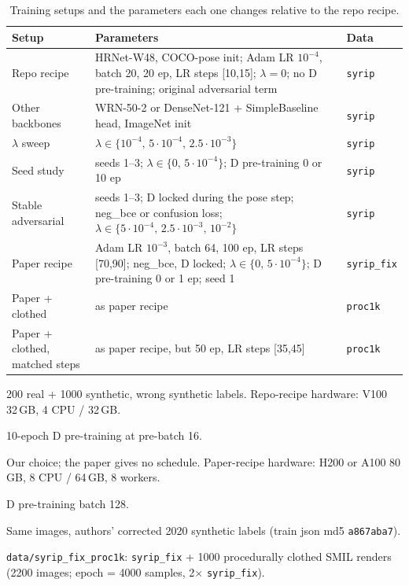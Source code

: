 \documentclass[10pt]{article}
\begin{document}
\begin{table}[h]\centering\small
\begin{threeparttable}
\caption{Training setups and the parameters each one changes relative to the repo recipe.}
\label{tab:setups}
\begin{tabularx}{\linewidth}{l X l}
\toprule
Setup & Parameters & Data \\
\midrule
Repo recipe & HRNet-W48, COCO-pose init; Adam LR $10^{-4}$, batch 20, 20 ep, LR steps [10,15]; $\lambda=0$; no D pre-training; original adversarial term & \texttt{syrip}\tnote{a} \\
Other backbones & WRN-50-2 or DenseNet-121 + SimpleBaseline head, ImageNet init & \texttt{syrip} \\
$\lambda$ sweep & $\lambda \in \{10^{-4},\, 5\cdot10^{-4},\, 2.5\cdot10^{-3}\}$ & \texttt{syrip} \\
Seed study & seeds 1--3; $\lambda \in \{0,\, 5\cdot10^{-4}\}$; D pre-training 0 or 10 ep\tnote{b} & \texttt{syrip} \\
Stable adversarial & seeds 1--3; D locked during the pose step; neg\_bce or confusion loss; $\lambda \in \{5\cdot10^{-4},\, 2.5\cdot10^{-3},\, 10^{-2}\}$ & \texttt{syrip} \\
\midrule
Paper recipe & Adam LR $10^{-3}$, batch 64, 100 ep, LR steps [70,90]\tnote{c}; neg\_bce, D locked; $\lambda \in \{0,\, 5\cdot10^{-4}\}$; D pre-training 0 or 1 ep\tnote{d}; seed 1 & \texttt{syrip\_fix}\tnote{e} \\
Paper + clothed & as paper recipe & \texttt{proc1k}\tnote{f} \\
Paper + clothed, matched steps & as paper recipe, but 50 ep, LR steps [35,45] & \texttt{proc1k} \\
\bottomrule
\end{tabularx}
\begin{tablenotes}\footnotesize
\item[a] 200 real + 1000 synthetic, wrong synthetic labels. Repo-recipe hardware: V100 32\,GB, 4 CPU / 32\,GB.
\item[b] 10-epoch D pre-training at pre-batch 16.
\item[c] Our choice; the paper gives no schedule. Paper-recipe hardware: H200 or A100 80\,GB, 8 CPU / 64\,GB, 8 workers.
\item[d] D pre-training batch 128.
\item[e] Same images, authors' corrected 2020 synthetic labels (train json md5 \texttt{a867aba7}).
\item[f] \texttt{data/syrip\_fix\_proc1k}: \texttt{syrip\_fix} + 1000 procedurally clothed SMIL renders (2200 images; epoch = 4000 samples, 2$\times$ \texttt{syrip\_fix}).
\end{tablenotes}
\end{threeparttable}
\end{table}
\end{document}
